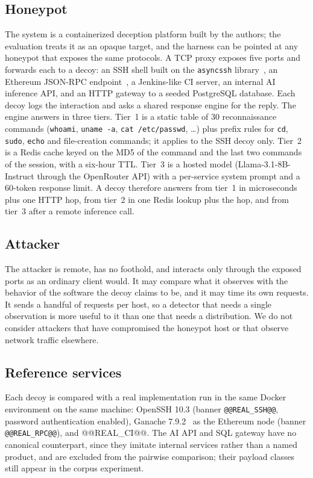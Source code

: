 \documentclass[conference]{IEEEtran}
\begin{document}
\subsection{Honeypot}
The system is a containerized deception platform built by the authors; the evaluation treats it as an opaque target, and the harness can be pointed at any honeypot that exposes the same protocols. A TCP proxy exposes five ports and forwards each to a decoy: an SSH shell built on the \texttt{asyncssh} library~\cite{ref12}, an Ethereum JSON-RPC endpoint~\cite{ref13,ref14}, a Jenkins-like CI server, an internal AI inference API, and an HTTP gateway to a seeded PostgreSQL database. Each decoy logs the interaction and asks a shared response engine for the reply. The engine answers in three tiers. Tier~1 is a static table of 30 reconnaissance commands (\texttt{whoami}, \texttt{uname -a}, \texttt{cat /etc/passwd}, \ldots) plus prefix rules for \texttt{cd}, \texttt{sudo}, \texttt{echo} and file-creation commands; it applies to the SSH decoy only. Tier~2 is a Redis cache keyed on the MD5 of the command and the last two commands of the session, with a six-hour TTL. Tier~3 is a hosted model (Llama-3.1-8B-Instruct through the OpenRouter API) with a per-service system prompt and a 60-token response limit. A decoy therefore answers from tier~1 in microseconds plus one HTTP hop, from tier~2 in one Redis lookup plus the hop, and from tier~3 after a remote inference call.

\subsection{Attacker}
The attacker is remote, has no foothold, and interacts only through the exposed ports as an ordinary client would. It may compare what it observes with the behavior of the software the decoy claims to be, and it may time its own requests. It sends a handful of requests per host, so a detector that needs a single observation is more useful to it than one that needs a distribution. We do not consider attackers that have compromised the honeypot host or that observe network traffic elsewhere.

\subsection{Reference services}
Each decoy is compared with a real implementation run in the same Docker environment on the same machine: OpenSSH 10.3 (banner \texttt{@@REAL_SSH@@}, password authentication enabled), Ganache 7.9.2~\cite{ref16} as the Ethereum node (banner \texttt{@@REAL_RPC@@}), and @@REAL_CI@@. The AI API and SQL gateway have no canonical counterpart, since they imitate internal services rather than a named product, and are excluded from the pairwise comparison; their payload classes still appear in the corpus experiment.
\end{document}
